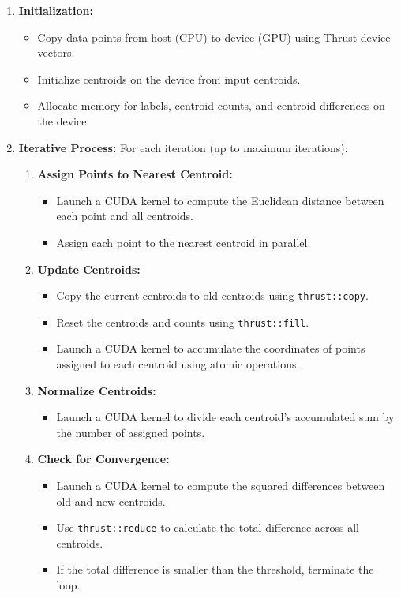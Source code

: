 \documentclass[letterpaper,12pt]{article}
\theoremstyle{remark}
\begin{document}
\begin{enumerate}
       \item \textbf{Initialization:}
    \begin{itemize}
        \item Copy data points from host (CPU) to device (GPU) using Thrust device vectors.
        \item Initialize centroids on the device from input centroids.
        \item Allocate memory for labels, centroid counts, and centroid differences on the device.
    \end{itemize}
    
    \item \textbf{Iterative Process:} For each iteration (up to maximum iterations):
    \begin{enumerate}
        \item \textbf{Assign Points to Nearest Centroid:}
        \begin{itemize}
            \item Launch a CUDA kernel to compute the Euclidean distance between each point and all centroids.
            \item Assign each point to the nearest centroid in parallel.
        \end{itemize}
        
        \item \textbf{Update Centroids:}
        \begin{itemize}
            \item Copy the current centroids to old centroids using \texttt{thrust::copy}.
            \item Reset the centroids and counts using \texttt{thrust::fill}.
            \item Launch a CUDA kernel to accumulate the coordinates of points assigned to each centroid using atomic operations.
        \end{itemize}
        
        \item \textbf{Normalize Centroids:}
        \begin{itemize}
            \item Launch a CUDA kernel to divide each centroid’s accumulated sum by the number of assigned points.
        \end{itemize}
        
        \item \textbf{Check for Convergence:}
        \begin{itemize}
            \item Launch a CUDA kernel to compute the squared differences between old and new centroids.
            \item Use \texttt{thrust::reduce} to calculate the total difference across all centroids.
            \item If the total difference is smaller than the threshold, terminate the loop.
        \end{itemize}
    \end{enumerate}
    

\end{enumerate}
\end{document}
